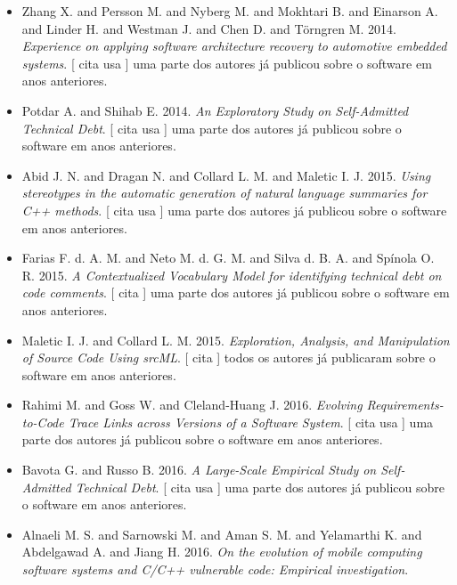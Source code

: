 \begin{itemize}
      [
          cita
          usa
      ]
uma parte dos autores já publicou sobre o software em anos anteriores.
\item Zhang X. and Persson M. and Nyberg M. and Mokhtari B. and Einarson A. and Linder H. and Westman J. and Chen D. and Törngren M.
      2014.
        \textit{ Experience on applying software architecture recovery to automotive embedded systems}.
      [
          cita
          usa
      ]
uma parte dos autores já publicou sobre o software em anos anteriores.
\item Potdar A. and Shihab E.
      2014.
        \textit{ An Exploratory Study on Self-Admitted Technical Debt}.
      [
          cita
          usa
      ]
uma parte dos autores já publicou sobre o software em anos anteriores.
\item Abid J. N. and Dragan N. and Collard L. M. and Maletic I. J.
      2015.
        \textit{ Using stereotypes in the automatic generation of natural language summaries for C++ methods}.
      [
          cita
          usa
      ]
uma parte dos autores já publicou sobre o software em anos anteriores.
\item Farias F. d. A. M. and Neto M. d. G. M. and Silva d. B. A. and Spínola O. R.
      2015.
        \textit{ A Contextualized Vocabulary Model for identifying technical debt on code comments}.
      [
          cita
      ]
uma parte dos autores já publicou sobre o software em anos anteriores.
\item Maletic I. J. and Collard L. M.
      2015.
        \textit{ Exploration, Analysis, and Manipulation of Source Code Using srcML}.
      [
          cita
      ]
todos os autores já publicaram sobre o software em anos anteriores.
\item Rahimi M. and Goss W. and Cleland-Huang J.
      2016.
        \textit{ Evolving Requirements-to-Code Trace Links across Versions of a Software System}.
      [
          cita
          usa
      ]
uma parte dos autores já publicou sobre o software em anos anteriores.
\item Bavota G. and Russo B.
      2016.
        \textit{ A Large-Scale Empirical Study on Self-Admitted Technical Debt}.
      [
          cita
          usa
      ]
uma parte dos autores já publicou sobre o software em anos anteriores.
\item Alnaeli M. S. and Sarnowski M. and Aman S. M. and Yelamarthi K. and Abdelgawad A. and Jiang H.
      2016.
        \textit{ On the evolution of mobile computing software systems and C/C++ vulnerable code: Empirical investigation}.

\end{itemize}
